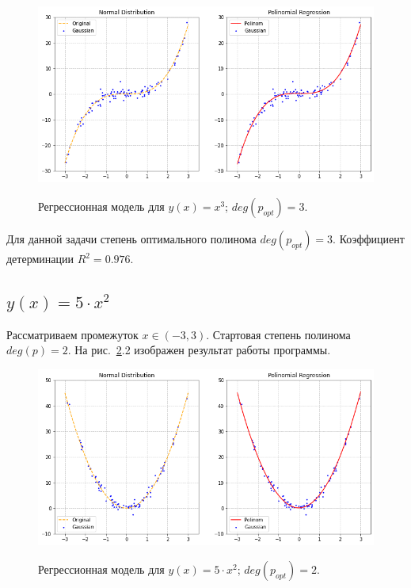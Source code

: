 \documentclass[12pt, a4paper]{article}
\begin{document}
    \begin{figure}[h!]
        \center
        \includegraphics[width = 14cm]{f1.png}
        \label{image41}
        \caption{Регрессионная модель для $y(x) = x^{3}$; $deg(p_{opt}) = 
            3$.}
    \end{figure}
    
    Для данной задачи степень оптимального полинома $deg(p_{opt}) = 3$. 
    Коэффициент детерминации $R^{2} = 0.976$.
    
    \subsection{$y(x) = 5 \cdot x^{2}$}
    
    Рассматриваем промежуток $x \in (-3, 3)$. Стартовая степень полинома 
    $deg(p) = 2$. На рис.~\ref{image42}.2 изображен результат работы 
    программы.
    
    \begin{figure}[h!]
        \center
        \includegraphics[width = 14cm]{f2.png}
        \label{image42}
        \caption{Регрессионная модель для $y(x) = 5 \cdot x^{2}$; 
            $deg(p_{opt}) = 2$.}
    \end{figure}
    
\end{document}
